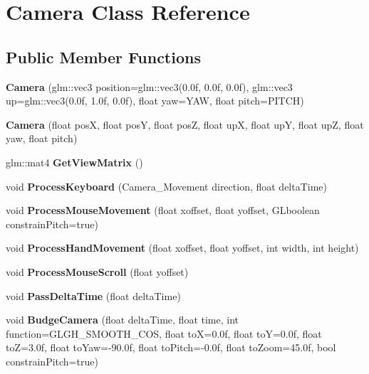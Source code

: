 \hypertarget{class_camera}{}\section{Camera Class Reference}
\label{class_camera}
\subsection*{Public Member Functions}
\begin{DoxyCompactItemize}
\item 
\mbox{\label{class_camera_adad6423186f3d7e4c461cff7274f2c87}} 
{\bfseries Camera} (glm\+::vec3 position=glm\+::vec3(0.\+0f, 0.\+0f, 0.\+0f), glm\+::vec3 up=glm\+::vec3(0.\+0f, 1.\+0f, 0.\+0f), float yaw=\+Y\+A\+W, float pitch=\+P\+I\+T\+C\+H)
\item 
\mbox{\label{class_camera_a3537fd723fdfb5fed73a084346270cf6}} 
{\bfseries Camera} (float posX, float posY, float posZ, float upX, float upY, float upZ, float yaw, float pitch)
\item 
\mbox{\label{class_camera_affa333055635aed96518c4c66be9a70c}} 
glm\+::mat4 {\bfseries Get\+View\+Matrix} ()
\item 
\mbox{\label{class_camera_aebba33a8b281fe2598bcafc54a55d296}} 
void {\bfseries Process\+Keyboard} (Camera\+\_\+\+Movement direction, float delta\+Time)
\item 
\mbox{\label{class_camera_a656c2a8dc40150874f15bce47b789751}} 
void {\bfseries Process\+Mouse\+Movement} (float xoffset, float yoffset, G\+Lboolean constrain\+Pitch=true)
\item 
\mbox{\label{class_camera_ae5d2a8707ab3d82c13f47ac1e84549d8}} 
void {\bfseries Process\+Hand\+Movement} (float xoffset, float yoffset, int width, int height)
\item 
\mbox{\label{class_camera_a05d150f7dc98940d2dd62f686cc2efe3}} 
void {\bfseries Process\+Mouse\+Scroll} (float yoffset)
\item 
\mbox{\label{class_camera_a876ab8fb9a4f53c77ff16161f6890b5e}} 
void {\bfseries Pass\+Delta\+Time} (float delta\+Time)
\item 
\mbox{\label{class_camera_a6698995d3bb7c7ef164676e255156d45}} 
void {\bfseries Budge\+Camera} (float delta\+Time, float time, int function=G\+L\+G\+H\+\_\+\+S\+M\+O\+O\+T\+H\+\_\+\+C\+OS, float toX=0.\+0f, float to\+Y=0.\+0f, float to\+Z=3.\+0f, float to\+Yaw=-\/90.\+0f, float to\+Pitch=-\/0.\+0f, float to\+Zoom=45.\+0f, bool constrain\+Pitch=true)
\end{DoxyCompactItemize}
